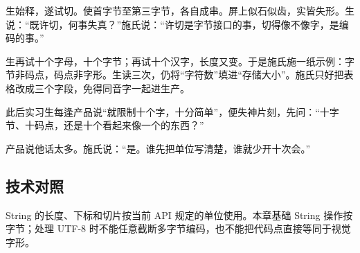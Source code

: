 生始释，遂试切。使首字节至第三字节，各自成串。屏上似石似齿，实皆失形。生说：“既许切，何事失真？”施氏说：“许切是字节接口的事，切得像不像字，是编码的事。”

生再试十个字母，十个字节；再试十个汉字，长度又变。于是施氏施一纸示例：字节非码点，码点非字形。生读三次，仍将“字符数”填进“存储大小”。施氏只好把表格改成三个字段，免得同音字一起进生产。

此后实习生每逢产品说“就限制十个字，十分简单”，便失神片刻，先问：“十字节、十码点，还是十个看起来像一个的东西？”

产品说他话太多。施氏说：“是。谁先把单位写清楚，谁就少开十次会。”

\subsection*{技术对照}

String 的长度、下标和切片按当前 API 规定的单位使用。本章基础 String 操作按字节；处理 UTF-8 时不能任意截断多字节编码，也不能把代码点直接等同于视觉字形。
